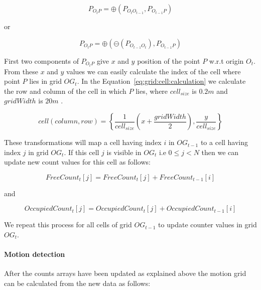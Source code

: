 \begin{equation}
P_{O_tP} = \oplus (P_{O_tO_{t-1}}, P_{O_{t-1}P})
\label{eq:pose:compound}
\end{equation}

or

\begin{equation}
P_{O_tP} = \oplus (\ominus(P_{O_{t-1}O_t}), P_{O_{t-1}P})
\label{eq:pose:compound:inverse}
\end{equation}

First two components of $P_{O_tP}$ give $x$ and $y$ position of the point $P$ w.r.t origin $O_t$. From these $x$ and $y$ values we can easily calculate the index of the cell where point $P$ lies in grid $OG_t$. In the Equation~\ref{eq:grid:cell:calculation} we calculate the row and column of the cell in which $P$ lies, where $cell_{size}$ is $0.2m$ and $gridWidth$ is $20m$ .

\begin{equation}
cell(column,row)=\left\{\frac{1}{cell_{size}}(x+\frac{gridWidth}{2}),\frac{y}{cell_{size}} \right\}
\label{eq:grid:cell:calculation}
\end{equation}




These transformations will map a cell having index $i$ in $OG_{t-1}$ to a cell having index $j$ in grid $OG_t$. If this cell $j$ is visible in $OG_t$ i.e $0 \leq j<N$ then we can update new count values for this cell as follows:

\begin{equation}
FreeCount_t[j] = FreeCount_t[j] + FreeCount_{t-1}[i]
\end{equation}

and

\begin{equation}
OccupiedCount_t[j] = OccupiedCount_t[j] + OccupiedCount_{t-1}[i]
\end{equation}

We repeat this process for all cells of grid $OG_{t-1}$ to update counter values in grid $OG_{t}$.

\paragraph{Motion detection} After the counts arrays have been updated as explained above the motion grid can be calculated from the new data as follows:

